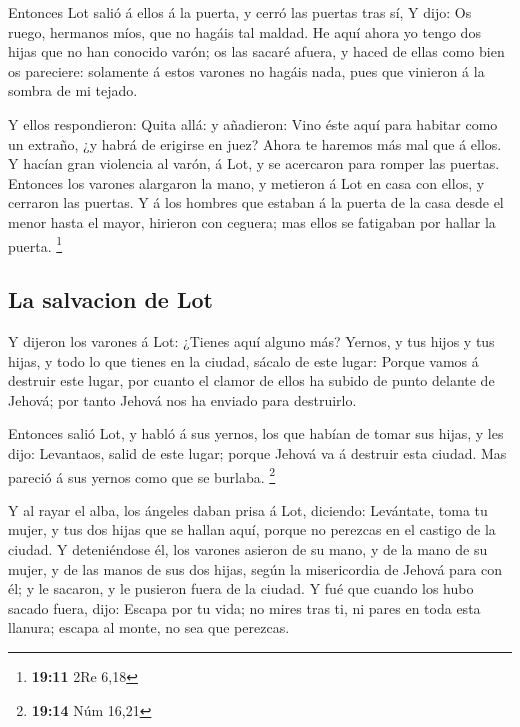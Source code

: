  Entonces Lot salió á ellos á la puerta, y cerró las
puertas tras sí,  Y dijo: Os ruego, hermanos míos, que no
hagáis tal maldad.  He aquí ahora yo tengo dos hijas que
no han conocido varón; os las sacaré afuera, y haced de ellas como bien
os pareciere: solamente á estos varones no hagáis nada, pues que
vinieron á la sombra de mi tejado.

 Y ellos respondieron: Quita allá: y añadieron: Vino éste
aquí para habitar como un extraño, ¿y habrá de erigirse en juez? Ahora
te haremos más mal que á ellos. Y hacían gran violencia al varón, á Lot,
y se acercaron para romper las puertas.  Entonces los
varones alargaron la mano, y metieron á Lot en casa con ellos, y
cerraron las puertas.  Y á los hombres que estaban á la
puerta de la casa desde el menor hasta el mayor, hirieron con ceguera;
mas ellos se fatigaban por hallar la puerta. \footnote{\textbf{19:11}
  2Re 6,18}

\hypertarget{la-salvacion-de-lot}{%
\subsection{La salvacion de Lot}\label{la-salvacion-de-lot}}

 Y dijeron los varones á Lot: ¿Tienes aquí alguno más?
Yernos, y tus hijos y tus hijas, y todo lo que tienes en la ciudad,
sácalo de este lugar:  Porque vamos á destruir este
lugar, por cuanto el clamor de ellos ha subido de punto delante de
Jehová; por tanto Jehová nos ha enviado para destruirlo.

 Entonces salió Lot, y habló á sus yernos, los que habían
de tomar sus hijas, y les dijo: Levantaos, salid de este lugar; porque
Jehová va á destruir esta ciudad. Mas pareció á sus yernos como que se
burlaba. \footnote{\textbf{19:14} Núm 16,21}

 Y al rayar el alba, los ángeles daban prisa á Lot,
diciendo: Levántate, toma tu mujer, y tus dos hijas que se hallan aquí,
porque no perezcas en el castigo de la ciudad.  Y
deteniéndose él, los varones asieron de su mano, y de la mano de su
mujer, y de las manos de sus dos hijas, según la misericordia de Jehová
para con él; y le sacaron, y le pusieron fuera de la ciudad.
 Y fué que cuando los hubo sacado fuera, dijo: Escapa por
tu vida; no mires tras ti, ni pares en toda esta llanura; escapa al
monte, no sea que perezcas.

